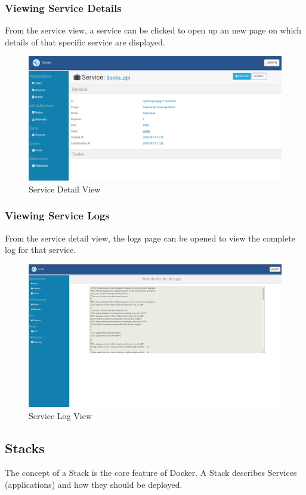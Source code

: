 \documentclass[]{article}
\begin{document}
\subsubsection{Viewing Service Details}
From the service view, a service can be clicked to open up an new page
on which details of that specific service are displayed.

\begin{figure}[H]
	\centering
	\includegraphics[scale=0.4]{service_details.png}
	\caption{Service Detail View}
\end{figure}

\subsubsection{Viewing Service Logs}
From the service detail view, the logs page can be opened to view the 
complete log for that service.

\begin{figure}[H]
	\centering
	\includegraphics[scale=0.4]{services_logs.png}
	\caption{Service Log View}
\end{figure}

\subsection{Stacks}
The concept of a Stack is the core feature of Docker.
A Stack describes Services (applications) and how they should be deployed.
\end{document}
